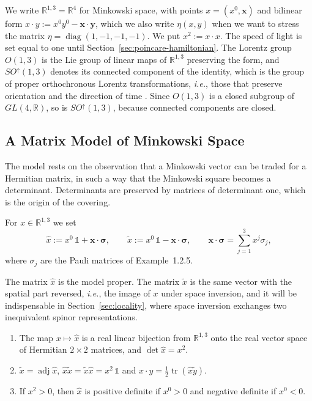 	We write $\mathbb{R}^{1,3}=\mathbb{R}^4$ for Minkowski space, with points $x=(x^0,\mathbf{x})$ and bilinear form $x\cdot y:=x^0y^0-\mathbf{x}\cdot\mathbf{y}$, which we also write $\eta(x,y)$ when we want to stress the matrix $\eta=\operatorname{diag}(1,-1,-1,-1)$. We put $x^2:=x\cdot x$. The speed of light is set equal to one until Section~\ref{sec:poincare-hamiltonian}. The Lorentz group $O(1,3)$ is the Lie group of linear maps of $\mathbb{R}^{1,3}$ preserving the form, and $SO^\uparrow(1,3)$ denotes its connected component of the identity, which is the group of proper orthochronous Lorentz transformations, \textit{i.e.}, those that preserve orientation and the direction of time \cite[TODO-location]{TODO-BarutRaczka}. Since $O(1,3)$ is a closed subgroup of $GL(4,\mathbb{R})$, so is $SO^\uparrow(1,3)$, because connected components are closed.
	
	\subsection*{A Matrix Model of Minkowski Space}
	
	The model rests on the observation that a Minkowski vector can be traded for a Hermitian matrix, in such a way that the Minkowski square becomes a determinant. Determinants are preserved by matrices of determinant one, which is the origin of the covering.
	
	\begin{definition}\label{def:hermitian-model}
		For $x\in\mathbb{R}^{1,3}$ we set
		\begin{equation}\label{eq:hermitian-map}
			\hat{x}:=x^0\,\mathbb{1}+\mathbf{x}\cdot\boldsymbol{\sigma},\qquad \tilde{x}:=x^0\,\mathbb{1}-\mathbf{x}\cdot\boldsymbol{\sigma}, \qquad \mathbf{x}\cdot\boldsymbol{\sigma}=\sum_{j=1}^3x^j\sigma_j,
		\end{equation}
		where $\sigma_j$ are the Pauli matrices of Example~1.2.5.
	\end{definition}
	
	The matrix $\hat{x}$ is the model proper. The matrix $\tilde{x}$ is the same vector with the spatial part reversed, \textit{i.e.}, the image of $x$ under space inversion, and it will be indispensable in Section~\ref{sec:locality}, where space inversion exchanges two inequivalent spinor representations.
	
	\begin{lemma}\label{lem:hermitian-model}
		\begin{enumerate}
			\item The map $x\mapsto\hat{x}$ is a real linear bijection from $\mathbb{R}^{1,3}$ onto the real vector space of Hermitian $2\times2$ matrices, and $\det\hat{x}=x^2$.
			\item $\tilde{x}=\operatorname{adj}\hat{x}$, $\hat{x}\tilde{x}=\tilde{x}\hat{x}=x^2\,\mathbb{1}$ and $x\cdot y=\tfrac12\operatorname{tr}(\hat{x}\tilde{y})$.
			\item If $x^2>0$, then $\hat{x}$ is positive definite if $x^0>0$ and negative definite if $x^0<0$.
		\end{enumerate}
	\end{lemma}
	
